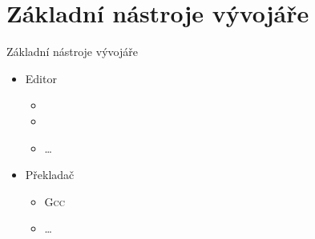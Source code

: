 

\section{Základní nástroje vývojáře}
\frame{\sectionpage}

\begin{frame}{Základní nástroje vývojáře}

  \begin{itemize}
    \item Editor
    \begin{itemize}
      \item {}
      \item \qtc
      \item \dots
    \end{itemize}

    \pause

    \item Překladač
    \begin{itemize}
      \item \textsc{Gcc}
      \item \dots
    \end{itemize}
  \end{itemize}

\end{frame}

